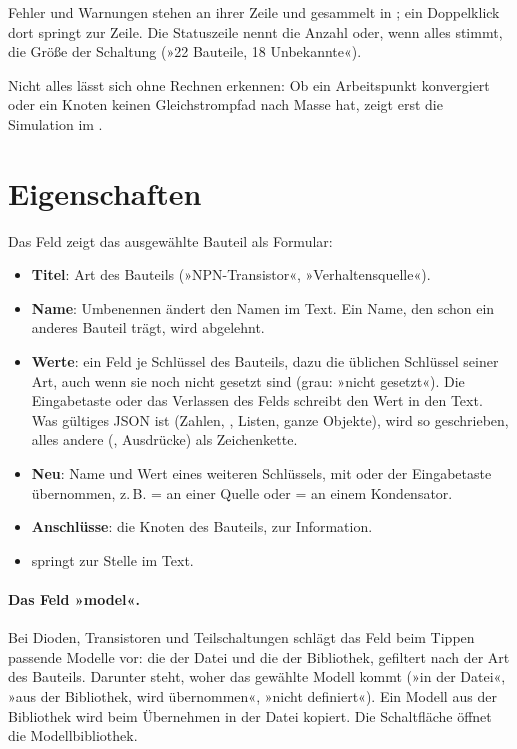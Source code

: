 Fehler und Warnungen stehen an ihrer Zeile und gesammelt in
; ein Doppelklick dort springt zur Zeile. Die Statuszeile
nennt die Anzahl oder, wenn alles stimmt, die Größe der Schaltung (»22
Bauteile, 18 Unbekannte«).

Nicht alles lässt sich ohne Rechnen erkennen: Ob ein Arbeitspunkt
konvergiert oder ein Knoten keinen Gleichstrompfad nach Masse hat, zeigt
erst die Simulation im .

\section{Eigenschaften}

Das Feld  zeigt das ausgewählte Bauteil als Formular:

\begin{itemize}
  \item \textbf{Titel}: Art des Bauteils (»NPN-Transistor«,
    »Verhaltensquelle«).
  \item \textbf{Name}: Umbenennen ändert den Namen im Text. Ein Name, den
    schon ein anderes Bauteil trägt, wird abgelehnt.
  \item \textbf{Werte}: ein Feld je Schlüssel des Bauteils, dazu die
    üblichen Schlüssel seiner Art, auch wenn sie noch nicht gesetzt sind
    (grau: »nicht gesetzt«). Die Eingabetaste oder das Verlassen des Felds
    schreibt den Wert in den Text. Was gültiges JSON ist (Zahlen,
    , Listen, ganze Objekte), wird so geschrieben, alles andere
    (, Ausdrücke) als Zeichenkette.
  \item \textbf{Neu}: Name und Wert eines weiteren Schlüssels, mit \taste{+}
    oder der Eingabetaste übernommen, z.\,B.  =  an einer
    Quelle oder  =  an einem Kondensator.
  \item \textbf{Anschlüsse}: die Knoten des Bauteils, zur Information.
  \item {} springt zur Stelle im Text.
\end{itemize}

\paragraph{Das Feld »model«.}
Bei Dioden, Transistoren und Teilschaltungen schlägt das Feld beim Tippen
passende Modelle vor: die der Datei und die der Bibliothek, gefiltert nach
der Art des Bauteils. Darunter steht, woher das gewählte Modell kommt (»in
der Datei«, »aus der Bibliothek, wird übernommen«, »nicht definiert«). Ein
Modell aus der Bibliothek wird beim Übernehmen in  der
Datei kopiert. Die Schaltfläche \menue{\dots} öffnet die Modellbibliothek.

